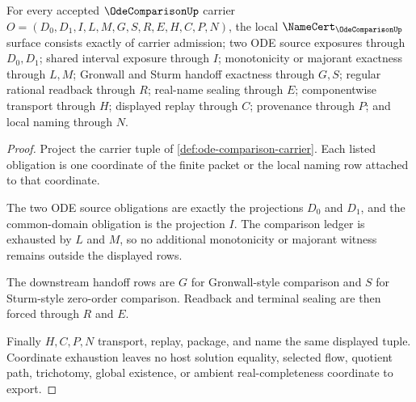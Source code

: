 \begin{theorem}
\label{thm:ode-comparison-namecert-obligations}
For every accepted $\OdeComparisonUp$ carrier $O=(D_0,D_1,I,L,M,G,S,R,E,H,C,P,N)$, the local $\NameCert_{\OdeComparisonUp}$ surface consists exactly of carrier admission; two ODE source exposures through $D_0,D_1$; shared interval exposure through $I$; monotonicity or majorant exactness through $L,M$; Gronwall and Sturm handoff exactness through $G,S$; regular rational readback through $R$; real-name sealing through $E$; componentwise transport through $H$; displayed replay through $C$; provenance through $P$; and local naming through $N$.
\end{theorem}
\begin{proof}
Project the carrier tuple of \autoref{def:ode-comparison-carrier}. Each listed obligation is one coordinate of the finite packet or the local naming row attached to that coordinate.

The two ODE source obligations are exactly the projections $D_0$ and $D_1$, and the common-domain obligation is the projection $I$. The comparison ledger is exhausted by $L$ and $M$, so no additional monotonicity or majorant witness remains outside the displayed rows.

The downstream handoff rows are $G$ for Gronwall-style comparison and $S$ for Sturm-style zero-order comparison. Readback and terminal sealing are then forced through $R$ and $E$.

Finally $H,C,P,N$ transport, replay, package, and name the same displayed tuple. Coordinate exhaustion leaves no host solution equality, selected flow, quotient path, trichotomy, global existence, or ambient real-completeness coordinate to export.
\end{proof}

